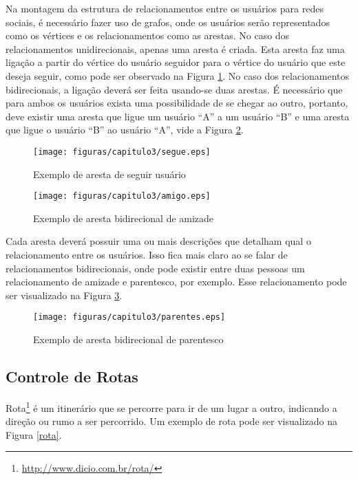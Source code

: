 Na montagem da estrutura de relacionamentos entre os usuários para redes sociais, é necessário fazer uso de grafos, onde os usuários serão representados como os vértices e os relacionamentos como as arestas. No caso dos relacionamentos unidirecionais, apenas uma aresta é criada. Esta aresta faz uma ligação a partir do vértice do usuário seguidor para o vértice do usuário que este deseja seguir, como pode ser observado na Figura \ref{segue}. No caso dos relacionamentos bidirecionais, a ligação deverá ser feita usando-se duas arestas. É necessário que para ambos os usuários exista uma possibilidade de se chegar ao outro, portanto, deve existir uma aresta que ligue um usuário ``A'' a um usuário ``B'' e uma aresta que ligue o usuário ``B'' ao usuário ``A'', vide a Figura \ref{amigo}.

\begin{figure}[!h]
	\centering
	\texttt{[image: figuras/capitulo3/segue.eps]}
	\caption{Exemplo de aresta de seguir usuário}
	\label{segue}
\end{figure}

\begin{figure}[!h]
	\centering
	\texttt{[image: figuras/capitulo3/amigo.eps]}
	\caption{Exemplo de aresta bidirecional de amizade}
	\label{amigo}
\end{figure}

Cada aresta deverá possuir uma ou mais descrições que detalham qual o relacionamento entre os usuários. Isso fica mais claro ao se falar de relacionamentos bidirecionais, onde pode existir entre duas pessoas um relacionamento de amizade e parentesco, por exemplo. Esse relacionamento pode ser visualizado na Figura \ref{parentes}.

\newpage

\begin{figure}[!h]
	\centering
	\texttt{[image: figuras/capitulo3/parentes.eps]}
	\caption{Exemplo de aresta bidirecional de parentesco}
	\label{parentes}
\end{figure}

\subsection{Controle de Rotas}

Rota\footnote{\url{http://www.dicio.com.br/rota/}} é um itinerário que se percorre para ir de um lugar a outro, indicando a direção ou rumo a ser percorrido. Um exemplo de rota pode ser visualizado na Figura \ref{rota}.

